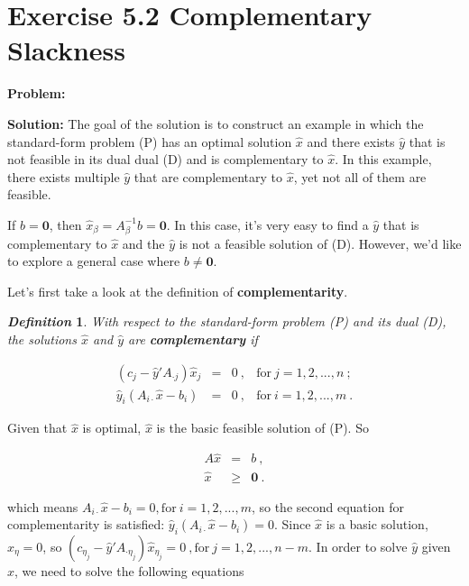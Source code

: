 \section{Exercise 5.2 Complementary Slackness}
\textbf{Problem:} 

\textbf{Solution:} The goal of the solution is to construct an example in which the standard-form problem (P) has an optimal solution $\hat{x}$ and there exists $\hat{y}$ that is not feasible in its dual dual (D) and is complementary to $\hat{x}$. In this example, there exists multiple $\hat{y}$ that are complementary to $\hat{x}$, yet not all of them are feasible. 

If $b=\mathbf{0}$, then $\hat{x}_\beta = A_\beta^{-1}b = \mathbf{0}$. In this case, it's very easy to find a $\hat{y}$ that is complementary to $\hat{x}$ and the $\hat{y}$ is not a feasible solution of (D). However, we'd like to explore a general case where $b\neq\mathbf{0}$.

Let's first take a look at the definition of \textbf{complementarity}.

\newtheorem{mydef}{\emph{\textbf{Definition}}}
\begin{mydef}
With respect to the standard-form problem (P) and its dual (D), the solutions $\hat{x}$ and $\hat{y}$ are \textbf{complementary} if 

\[
\begin{array}{rccl}
 (c_j-\hat{y}'A_{\cdot j})\hat{x}_j &  = & 0~,& \text{for}~j=1,2,...,n ~; \\
 \hat{y}_i(A_{i\cdot}\hat{x}-b_i) & = & 0~, & \text{for}~i=1,2,...,m ~.
\end{array}
\]

\end{mydef}

Given that $\hat{x}$ is optimal, $\hat{x}$ is the basic feasible solution of (P). So

\[
\begin{array}{rcl}
 A\hat{x} &=& b~, \\
 \hat{x} &\geq& \mathbf{0}~.
\end{array}
\]

which means $A_{i\cdot}\hat{x}-b_i = 0,\text{for}~i=1,2,...,m$, so the second equation for complementarity is satisfied: $\hat{y}_i(A_{i\cdot}\hat{x}-b_i) = 0$. Since $\hat{x}$ is a basic solution, $\hat{x}_{\eta} = 0$, so $(c_{\eta_j}-\hat{y}'A_{\cdot \eta_j})\hat{x}_{\eta_j} = 0~, \text{for}~j=1,2,...,n-m$. In order to solve $\hat{y}$ given $\hat{x}$, we need to solve the following equations

